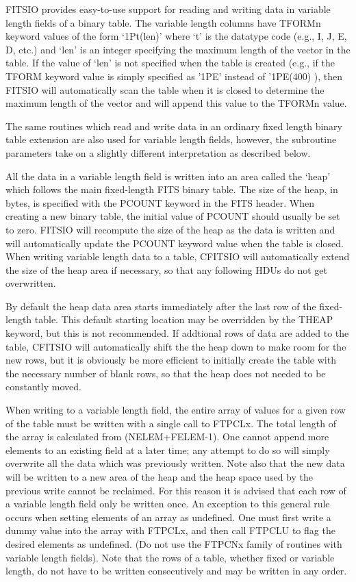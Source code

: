 \documentclass[11pt]{book}
\begin{document}
FITSIO provides easy-to-use support for reading and writing data in
variable length fields of a binary table. The variable length columns
have TFORMn keyword values of the form `1Pt(len)' where `t' is the
datatype code (e.g., I, J, E, D, etc.) and `len' is an integer
specifying the maximum length of the vector in the table.  If the value
of `len' is not specified when the table is created (e.g., if the TFORM
keyword value is simply specified as '1PE' instead of '1PE(400) ), then
FITSIO will automatically scan the table when it is closed to
determine the maximum length of the vector and will append this value
to the TFORMn value.

The same routines which read and write data in an ordinary fixed length
binary table extension are also used for variable length fields,
however, the subroutine parameters take on a slightly different
interpretation as described below.

All the data in a variable length field is written into an area called
the `heap' which follows the main fixed-length FITS binary table.  The
size of the heap, in bytes, is specified with the PCOUNT keyword in the
FITS header.  When creating a new binary table, the initial value of
PCOUNT should usually be set to zero.  FITSIO will recompute the size
of the heap as the data is written and will automatically update the
PCOUNT keyword value when the table is closed.  When writing variable
length data to a table, CFITSIO will automatically extend the size
of the heap area if necessary, so that any following HDUs do not
get overwritten.

By default the heap data area starts immediately after the last row of
the fixed-length table.  This default starting location may be
overridden by the THEAP keyword, but this is not recommended.
If addtional rows of data are added to the table, CFITSIO will
automatically shift the the heap down to make room for the new
rows, but it is obviously be more efficient to initially
create the table with the necessary number of blank rows, so that
the heap does not needed to be constantly moved.

When writing to a variable length field, the entire array of values for
a given row of the table must be written with a single call to FTPCLx.
The total length of the array is calculated from (NELEM+FELEM-1). One
cannot append more elements to an existing field at a later time; any
attempt to do so will simply overwrite all the data which was previously
written. Note also that the new data will be written to a new area of
the heap and the heap space used by the previous write cannot be
reclaimed. For this reason it is advised that each row of a variable
length field only be written once. An exception to this general rule
occurs when setting elements of an array as undefined. One must first
write a dummy value into the array with FTPCLx, and then call FTPCLU to
flag the desired elements as undefined. (Do not use the FTPCNx family
of routines with variable length fields). Note that the rows of a table,
whether fixed or variable length, do not have to be written
consecutively and may be written in any order.
\end{document}
